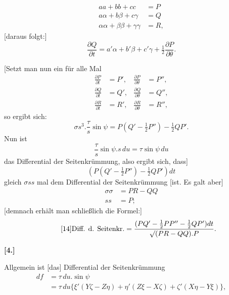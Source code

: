%
\[
\begin{aligned}
aa+bb+cc&=P\\
a\alpha+b\beta+c\gamma&=Q\\
\alpha\alpha+\beta\beta+\gamma\gamma&=R,
\end{aligned}
\]
[daraus folgt:]
\[
\frac{\partial Q}{\partial t}=a'\alpha+b'\beta+c'\gamma+\tfrac12\frac{\partial P}{\partial\theta}.
\]

[Setzt man nun ein für alle Mal
\[
\begin{aligned}
\frac{\partial P}{\partial t}&=P',&\frac{\partial P}{\partial\theta}&=P'',\\
\frac{\partial Q}{\partial t}&=Q',&\frac{\partial Q}{\partial\theta}&=Q'',\\
\frac{\partial R}{\partial t}&=R',&\frac{\partial R}{\partial\theta}&=R'',
\end{aligned}
\]
so ergibt sich:
\[
\sigma s^3.\frac{\tau}{s}\sin\psi=P(Q'-\tfrac12P'')-\tfrac12QP'.
\]
Nun ist
\[
\frac{\tau}{s}\sin\psi.s\,du=\tau\sin\psi\,du
\]
das Differential der Seitenkrümmung, also ergibt sich, dass]
\[
(P(Q'-\tfrac12P'')-\tfrac12QP')dt
\]
gleich $\sigma ss$ mal dem Differential der Seitenkrümmung [ist. Es galt aber]
\[
\begin{aligned}
\sigma\sigma&=PR-QQ\\
ss&=P;
\end{aligned}
\]
[demnach erhält man schließlich die Formel:]
\begin{equation}\tag*{[14]}
\text{Diff. d. Seitenkr.}=\frac{(PQ'-\tfrac12PP''-\tfrac12QP')dt}{\mathord{\surd}(PR-QQ).P}.
\end{equation}
\begin{center}\bfseries [4.]\end{center}
\noindent\hspace*{1.2em}Allgemein ist [das] Differential der Seitenkrümmung
\[
\begin{aligned}
df&=\tau\,du.\sin\psi\\
&=\tau\,du\{\xi'(Y\zeta-Z\eta)+\eta'(Z\xi-X\zeta)+\zeta'(X\eta-Y\xi)\},
\end{aligned}
\]
